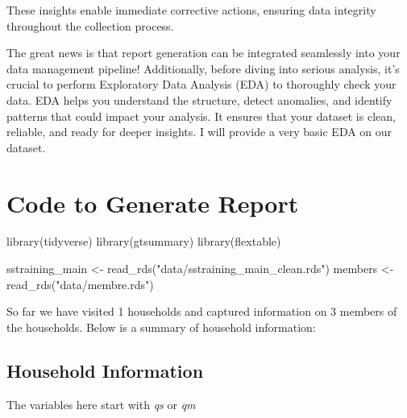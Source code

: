 \documentclass[
  letterpaper,
  DIV=11,
  numbers=noendperiod]{scrreprt}
\newenvironment{Shaded}{\begin{snugshade}}{\end{snugshade}}
\newcommand{\FunctionTok}[1]{\textcolor[rgb]{0.28,0.35,0.67}{#1}}
\newcommand{\NormalTok}[1]{\textcolor[rgb]{0.00,0.23,0.31}{#1}}
\newcommand{\OtherTok}[1]{\textcolor[rgb]{0.00,0.23,0.31}{#1}}
\newcommand{\StringTok}[1]{\textcolor[rgb]{0.13,0.47,0.30}{#1}}
\begin{document}
These insights enable immediate corrective actions, ensuring data
integrity throughout the collection process.

The great news is that report generation can be integrated seamlessly
into your data management pipeline! Additionally, before diving into
serious analysis, it's crucial to perform Exploratory Data Analysis
(EDA) to thoroughly check your data. EDA helps you understand the
structure, detect anomalies, and identify patterns that could impact
your analysis. It ensures that your dataset is clean, reliable, and
ready for deeper insights. I will provide a very basic EDA on our
dataset.

\section{Code to Generate Report}\label{code-to-generate-report}

\begin{Shaded}
\begin{Highlighting}[]
\FunctionTok{library}\NormalTok{(tidyverse)}
\FunctionTok{library}\NormalTok{(gtsummary)}
\FunctionTok{library}\NormalTok{(flextable)}
\end{Highlighting}
\end{Shaded}

\begin{Shaded}
\begin{Highlighting}[]
\NormalTok{sstraining\_main }\OtherTok{\textless{}{-}} \FunctionTok{read\_rds}\NormalTok{(}\StringTok{"data/sstraining\_main\_clean.rds"}\NormalTok{)}
\NormalTok{members }\OtherTok{\textless{}{-}} \FunctionTok{read\_rds}\NormalTok{(}\StringTok{"data/membre.rds"}\NormalTok{)}
\end{Highlighting}
\end{Shaded}

So far we have visited 1 households and captured information on 3
members of the households. Below is a summary of household information:

\subsection{Household Information}\label{household-information}

The variables here start with \emph{qs} or \emph{qm}
\end{document}
